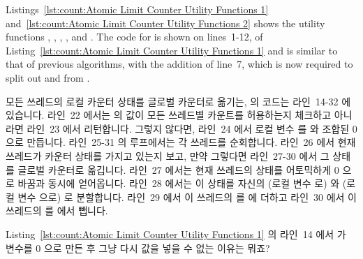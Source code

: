 Listings~\ref{lst:count:Atomic Limit Counter Utility Functions 1}
and~\ref{lst:count:Atomic Limit Counter Utility Functions 2}
shows the utility functions
,
,
,
, and
.
The code for  is shown on lines~1-12,
of Listing~\ref{lst:count:Atomic Limit Counter Utility Functions 1} and
is similar to that of previous algorithms, with the addition of
line~7, which is now required to split out  and
 from .
\fi

모든 쓰레드의 로컬 카운터 상태를 글로벌 카운터로 옮기는,
 의 코드는 라인~14-32 에 있습니다.
라인~22 에서는  의 값이 모든 쓰레드별 카운트를 허용하는지
체크하고 아니라면 라인~23 에서 리턴합니다.
그렇지 않다면, 라인~24 에서 로컬 변수  를  와
 조합된 0으로 만듭니다.
라인~25-31 의 루프에서는 각 쓰레드를 순회합니다.
라인~26 에서 현재 쓰레드가 카운터 상태를 가지고 있는지 보고, 만약 그렇다면
라인~27-30 에서 그 상태를 글로벌 카운터로 옮깁니다.
라인~27 에서는 현재 쓰레드의 상태를 어토믹하게 0 으로 바꿈과 동시에 얻어옵니다.
라인~28 에서는 이 상태를 자신의  (로컬 변수  로) 와
 (로컬 변수  으로) 로 분할합니다.
라인~29 에서 이 쓰레드의  를  에 더하고 라인~30
에서 이 쓰레드의  를  에서 뺍니다.

\QuickQuiz{}
	Listing~\ref{lst:count:Atomic Limit Counter Utility Functions 1} 의
	라인~14 에서  가  변수를 0 으로
	만든 후 그냥 다시 값을 넣을 수 없는 이유는 뭐죠?
	\iffalse

